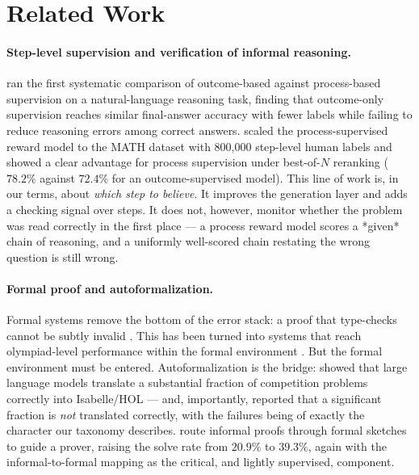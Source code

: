 \documentclass[11pt]{article}
\theoremstyle{definition}
\begin{document}
\section{Related Work}
\label{sec:related}

\paragraph{Step-level supervision and verification of informal reasoning.}
\citet{uesato2022processoutcome} ran the first systematic comparison of
outcome-based against process-based supervision on a natural-language reasoning
task, finding that outcome-only supervision reaches similar final-answer accuracy
with fewer labels while failing to reduce reasoning errors among correct answers.
\citet{lightman2024verify} scaled the process-supervised reward model to the MATH
dataset with 800{,}000 step-level human labels and showed a clear advantage for
process supervision under best-of-$N$ reranking ($78.2\%$ against $72.4\%$ for
an outcome-supervised model). This line of work is, in our terms, about
\emph{which step to believe}. It improves the generation layer and adds a
checking signal over steps. It does not, however, monitor whether the problem was
read correctly in the first place --- a process reward model scores a *given*
chain of reasoning, and a uniformly well-scored chain restating the wrong
question is still wrong.

\paragraph{Formal proof and autoformalization.}
Formal systems remove the bottom of the error stack: a proof that type-checks
cannot be subtly invalid \citep{demoura2021lean4}. This has been turned into
systems that reach olympiad-level performance within the formal environment
\citep{trinh2024alphageometry,hubert2025alphaproof}. But the formal environment
must be entered. Autoformalization is the bridge: \citet{wu2022autoformalization}
showed that large language models translate a substantial fraction of competition
problems correctly into Isabelle/HOL --- and, importantly, reported that a
significant fraction is \emph{not} translated correctly, with the failures being
of exactly the character our taxonomy describes. \citet{jiang2023draftsketchprove}
route informal proofs through formal sketches to guide a prover, raising the
solve rate from $20.9\%$ to $39.3\%$, again with the informal-to-formal mapping as
the critical, and lightly supervised, component.
\end{document}
